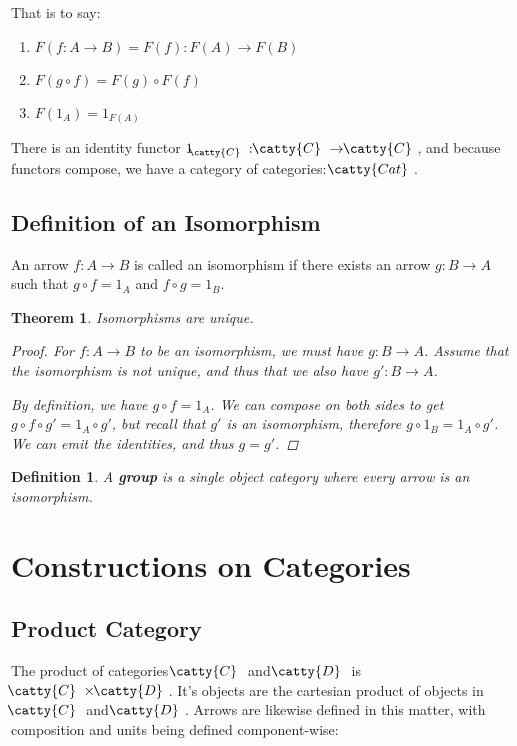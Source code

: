 \documentclass[]{article}
\newtheorem{theorem}{Theorem}
\newtheorem{definition}{Definition}
\newcommand{\tfarr}[3]{\ensuremath{#1 : #2 \to #3}}
\newcommand{\functor}[3]{\ensuremath{#1 : \cat{#2} \to \cat{#3}}}
\newcommand{\cat}[1]{\ensuremath{\!\! \catty{#1} \,\,}}
\begin{document}
That is to say:

\begin{enumerate}
  \item{$F(\tfarr{f}{A}{B}) = \tfarr{F(f)}{F(A)}{F(B)}$}
  \item{$F(g\circ f) = F(g) \circ F(f)$}
  \item{$F(1_A) = 1_{F(A)}$}
\end{enumerate}

There is an identity functor \functor{1_{\cat{C}}}{C}{C}, and because functors
compose, we have a category of categories: \cat{Cat}.

\subsection{Definition of an Isomorphism}

An arrow \tfarr{f}{A}{B} is called an isomorphism if there exists an arrow
\tfarr{g}{B}{A} such that $g \circ f = 1_A$ and $f \circ g = 1_B$.

\begin{theorem}
Isomorphisms are unique.
\begin{proof}
  For \tfarr{f}{A}{B} to be an isomorphism, we must have \tfarr{g}{B}{A}. Assume
  that the isomorphism is not unique, and thus that we also have
  \tfarr{g'}{B}{A}.

  By definition, we have $g \circ f = 1_A$. We can compose on both sides to get
  $g \circ f \circ g' = 1_A \circ g'$, but recall that $g'$ is an isomorphism,
  therefore $g \circ 1_B = 1_A \circ g'$. We can emit the identities, and thus
  $g = g'$.
\end{proof}
\end{theorem}

\begin{definition}
  A \textbf{group} is a single object category where every arrow is an
  isomorphism.
\end{definition}

\section{Constructions on Categories}

\subsection{Product Category}

The product of categories \cat{C} and \cat{D} is $\cat{C}\times\cat{D}$. It's
objects are the cartesian product of objects in \cat{C} and \cat{D}. Arrows are
likewise defined in this matter, with composition and units being defined
component-wise:
\end{document}
